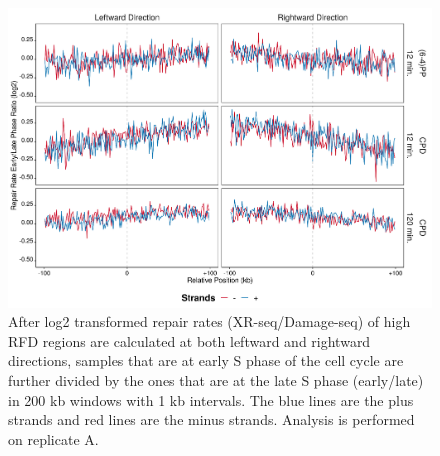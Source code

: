 \begin{figure}[H]
\begin{center}
\includegraphics[width=\textwidth]{Chapters/7_appendix/figures/supfig70}
\caption[Repair rate early/late ratio of high RFDs in 200 kb (replicate A).]{After log2 transformed repair rates (XR-seq/Damage-seq) of high RFD regions are calculated at both leftward and rightward directions, samples that are at early S phase of the cell cycle are further divided by the ones that are at the late S phase (early/late) in 200 kb windows with 1 kb intervals. The blue lines are the plus strands and red lines are the minus strands. Analysis is performed on replicate A.}
\label{supfig:rrel200rfdA}
\end{center}
\end{figure}

